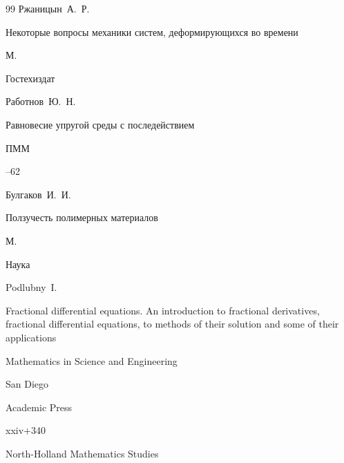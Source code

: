 \begin{thebibliography}{99}
\by Ржаницын~А.~Р.

\book Некоторые вопросы механики систем, деформирующихся во времени

\publaddr М.

\publ Гостехиздат






\by Работнов~Ю.~Н.

\paper Равновесие упругой среды с последействием

\jour ПММ




--62





\by Булгаков~И.~И.

\book Ползучесть полимерных материалов

\publaddr М.

\publ Наука






\by Podlubny~I.

\book Fractional differential equations. An introduction to fractional derivatives, fractional differential equations, to methods of their solution and some of their applications


\serial Mathematics in Science and Engineering


\publaddr San Diego

\publ Academic Press


\totalpages xxiv+340






\serial North-Holland Mathematics Studies




\end{thebibliography}
